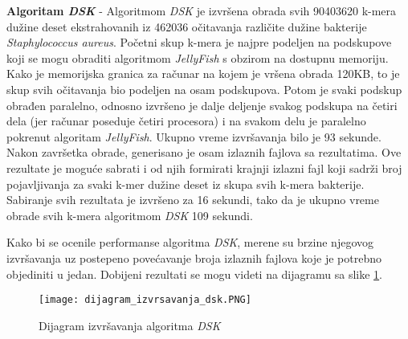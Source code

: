 \documentclass[12pt,oneside]{memoir}
\begin{document}
\textbf{Algoritam \textit{DSK}} - Algoritmom \textit{DSK} je izvršena obrada svih 90403620 k-mera dužine deset ekstrahovanih iz 462036 očitavanja različite dužine bakterije \textit{Staphylococcus aureus}. Početni skup k-mera je najpre podeljen na podskupove koji se mogu obraditi algoritmom \textit{JellyFish} s obzirom na dostupnu memoriju. Kako je memorijska granica za računar na kojem je vršena obrada 120KB, to je skup svih očitavanja bio podeljen na osam podskupova. Potom je svaki podskup obrađen paralelno, odnosno izvršeno je dalje deljenje svakog podskupa na četiri dela (jer računar poseduje četiri procesora) i na svakom delu je paralelno pokrenut algoritam \textit{JellyFish}. Ukupno vreme izvršavanja bilo je 93 sekunde. Nakon završetka obrade, generisano je osam izlaznih fajlova sa rezultatima. Ove rezultate je moguće sabrati i od njih formirati krajnji izlazni fajl koji sadrži broj pojavljivanja za svaki k-mer dužine deset iz skupa svih k-mera bakterije. Sabiranje svih rezultata je izvršeno za 16 sekundi, tako da je ukupno vreme obrade svih k-mera algoritmom \textit{DSK} 109 sekundi.

Kako bi se ocenile performanse algoritma \textit{DSK}, merene su brzine njegovog izvršavanja uz postepeno povećavanje broja izlaznih fajlova koje je potrebno objediniti u jedan. Dobijeni rezultati se mogu videti na dijagramu sa slike \ref{fig:dijagramIzvrsavanjaDSK}.

\begin{figure}[!ht]
  \centering
  \texttt{[image: dijagram\_izvrsavanja\_dsk.PNG]}
  \caption{Dijagram izvršavanja algoritma \textit{DSK}}
  \label{fig:dijagramIzvrsavanjaDSK}
\end{figure}

\end{document}
